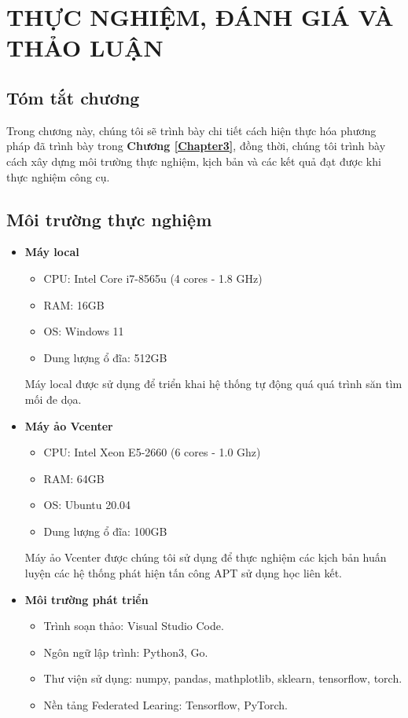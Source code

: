 \chapter{THỰC NGHIỆM, ĐÁNH GIÁ VÀ THẢO LUẬN} %
\label{Chapter4}

\section*{Tóm tắt chương}
Trong chương này, chúng tôi sẽ trình bày chi tiết cách hiện thực hóa phương pháp đã trình bày trong \textbf{Chương \ref{Chapter3}}, đồng thời, chúng tôi trình bày cách xây dựng môi trường thực nghiệm, kịch bản và các kết quả đạt được khi thực nghiệm công cụ.
\newline

\section{Môi trường thực nghiệm}

\begin{itemize}
    \item \textbf{Máy local}
    \begin{itemize}
        \item CPU: Intel\textregistered{} Core\texttrademark{} i7-8565u (4 cores - 1.8 GHz)
        \item RAM: 16GB
        \item OS: Windows 11
        \item Dung lượng ổ đĩa: 512GB
    \end{itemize}
    Máy local được sử dụng để triển khai hệ thống tự động quá quá trình săn tìm mối đe dọa.
    
    \item \textbf{Máy ảo Vcenter}
    \begin{itemize}
        \item CPU: Intel\textregistered{} Xeon\texttrademark{} E5-2660 (6 cores - 1.0 Ghz)
        \item RAM: 64GB
        \item OS: Ubuntu 20.04
        \item Dung lượng ổ đĩa: 100GB
    \end{itemize}
    Máy ảo Vcenter được chúng tôi sử dụng để thực nghiệm các kịch bản huấn luyện các hệ thống phát hiện tấn công APT sử dụng học liên kết.

    \item \textbf{Môi trường phát triển}
    \begin{itemize}
        \item Trình soạn thảo: Visual Studio Code.
        \item Ngôn ngữ lập trình: Python3, Go.
        \item Thư viện sử dụng: numpy, pandas, mathplotlib, sklearn, tensorflow, torch.
        \item Nền tảng Federated Learing: Tensorflow, PyTorch.
    \end{itemize}
\end{itemize}


